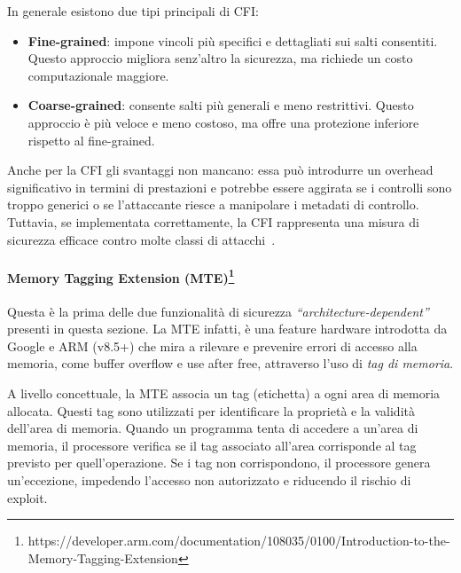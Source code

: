 In generale esistono due tipi principali di CFI:
\begin{itemize}
  \item \textbf{Fine-grained}: impone vincoli più specifici e dettagliati sui salti
    consentiti. Questo approccio migliora senz'altro la sicurezza, ma richiede un
    costo computazionale maggiore.

  \item \textbf{Coarse-grained}: consente salti più generali e meno restrittivi.
    Questo approccio è più veloce e meno costoso, ma offre una protezione inferiore
    rispetto al fine-grained.
\end{itemize}

Anche per la CFI gli svantaggi non mancano: essa può introdurre un overhead
significativo in termini di prestazioni e potrebbe essere aggirata se i
controlli sono troppo generici o se l'attaccante riesce a manipolare i metadati
di controllo. Tuttavia, se implementata correttamente, la CFI rappresenta una misura
di sicurezza efficace contro molte classi di attacchi~\cite{control_flow_integrity}.

\paragraph{Memory Tagging Extension (MTE)\protect\footnote{https://developer.arm.com/documentation/108035/0100/Introduction-to-the-Memory-Tagging-Extension}}
Questa è la prima delle due funzionalità di sicurezza \textit{``architecture-dependent''}
presenti in questa sezione. La MTE infatti, è una feature hardware introdotta da
Google e ARM (v8.5+) che mira a rilevare e prevenire errori di accesso alla memoria,
come buffer overflow e use after free, attraverso l'uso di \textit{tag di
memoria}.

A livello concettuale, la MTE associa un tag (etichetta) a ogni area di memoria allocata.
Questi tag sono utilizzati per identificare la proprietà e la validità dell'area
di memoria. Quando un programma tenta di accedere a un'area di memoria, il
processore verifica se il tag associato all'area corrisponde al tag previsto per
quell'operazione. Se i tag non corrispondono, il processore genera un'eccezione,
impedendo l'accesso non autorizzato e riducendo il rischio di exploit.

